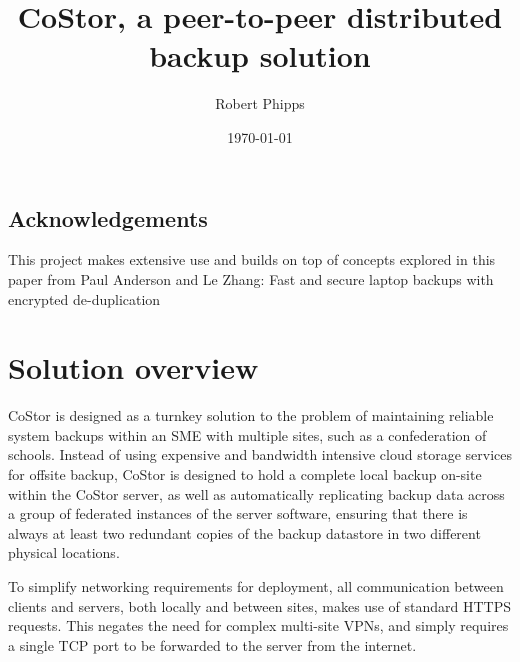 \documentclass[bsc,frontabs,twoside,singlespacing,parskip,deptreport]{infthesis}     %
\begin{document}
\title{CoStor, a peer-to-peer distributed backup solution}

\author{Robert Phipps}


\date{\today}


\maketitle

\section*{Acknowledgements}
This project makes extensive use and builds on top of concepts explored in this paper from
Paul Anderson and Le Zhang: Fast and secure laptop backups with encrypted de-duplication
\cite{macbac-lisa}

\tableofcontents



\chapter{Solution overview}

CoStor is designed as a turnkey solution to the problem of maintaining reliable system
backups within an SME with multiple sites, such as a confederation of schools. Instead
of using expensive and bandwidth intensive cloud storage services for offsite backup, 
CoStor is designed to hold a complete local backup on-site within the CoStor server, as
well as automatically replicating backup data across a group of federated instances of
the server software, ensuring that there is always at least two redundant copies of the
backup datastore in two different physical locations.

To simplify networking requirements for deployment, all communication between clients 
and servers, both locally and between sites, makes use of standard HTTPS requests. This 
negates the need for complex multi-site VPNs, and simply requires a single TCP port to
be forwarded to the server from the internet.
\end{document}
